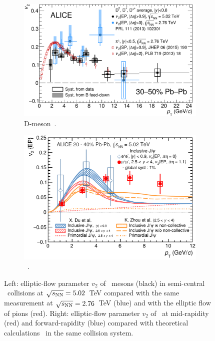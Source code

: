 \documentclass[10pt]{article}
\begin{document}
\begin{figure}[tb]
\centering
\begin{subfigure}[b]{0.495\textwidth}
  \centering
  \includegraphics[width=1.0\linewidth]{img/DmesonPions-eps-converted-to-25145}
  \caption{D-meson~\cite{ALICE:2017c}.}
  \label{fig:v2d0}
\end{subfigure} \quad
\begin{subfigure}[b]{0.475\textwidth}
  \centering
  \includegraphics[width=1.0\linewidth]{img/prl_fig4and5combined-26484}
  \caption{\jpsi~\cite{ALICE:2017d}.}
  \label{fig:v2jpsi}
\end{subfigure} \quad
\caption{Left: elliptic-flow parameter $v_2$ of \Dzero\ mesons (black) in semi-central \PbPb\ collisions at $\sqrt{s_{\rm NN}}=5.02$~TeV compared with the same measurement at $\sqrt{s_{\rm NN}}=2.76$~TeV (blue)
and with the elliptic flow of pions (red). Right: elliptic-flow parameter $v_2$ of \jpsi\ at mid-rapidity (red) and forward-rapidity (blue) compared with theoretical calculations~\cite{Zhou:2014, Du:2015} in the same collision system.}
\end{figure}
\end{document}
